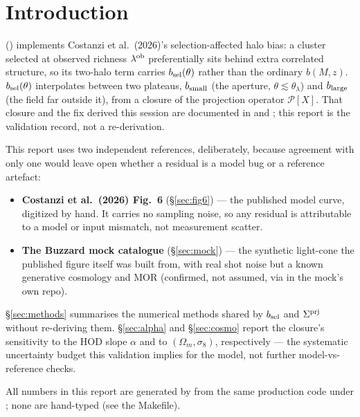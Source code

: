 \section{Introduction}

 () implements
Costanzi et al.\ (2026)'s selection-affected halo bias: a cluster selected
at observed richness $\lambda^{\rm ob}$ preferentially sits behind extra correlated
structure, so its two-halo term carries $b_{\rm sel}(\theta)$ rather than the
ordinary $b(M,z)$. $b_{\rm sel}(\theta)$ interpolates between two plateaus,
$b_{\rm small}$ (the aperture, $\theta\lesssim\theta_\lambda$) and $b_{\rm large}$
(the field far outside it), from a closure of the projection operator
$\mathcal P[X]$. That closure and the fix derived this session are
documented in  and
; this report is the validation
record, not a re-derivation.

This report uses two independent references, deliberately, because
agreement with only one would leave open whether a residual is a model
bug or a reference artefact:

\begin{itemize}
\item \textbf{Costanzi et al.\ (2026) Fig.~6} (\S\ref{sec:fig6}) --- the
  published model curve, digitized by hand. It carries no sampling
  noise, so any residual is attributable to a model or input mismatch,
  not measurement scatter.
\item \textbf{The Buzzard mock catalogue} (\S\ref{sec:mock}) --- the
  synthetic light-cone the published figure itself was built from, with
  real shot noise but a known generative cosmology and MOR (confirmed,
  not assumed, via  in the mock's own repo).
\end{itemize}

\S\ref{sec:methods} summarises the numerical methods shared by
$b_{\rm sel}$ and $\Sigma^{\rm prj}$ without re-deriving them. \S\ref{sec:alpha} and
\S\ref{sec:cosmo} report the closure's sensitivity to the HOD slope
$\alpha$ and to $(\Omega_m,\sigma_8)$, respectively --- the systematic
uncertainty budget this validation implies for the model, not further
model-vs-reference checks.

All numbers in this report are generated by
 from the same production code
under ; none are hand-typed (see the Makefile).
